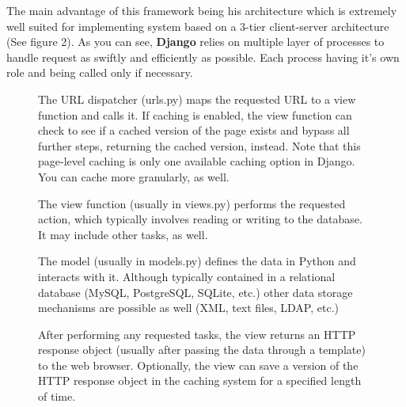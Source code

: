 The main advantage of this framework being his architecture which is
extremely well suited for implementing system based on a 3-tier
client-server architecture (See figure 2). As you can see, \textbf{Django}
relies on multiple layer of processes to handle request as swiftly and
efficiently as possible. Each process having it's own role and being called
only if necessary.  \newline

\begin{enumerate}
\begin{figure}
    \begin{minipage}{\linewidth}
        \centering
        \begin{minipage}{0.45\linewidth}
                \item The URL dispatcher (urls.py) maps the requested URL
                    to a view function and calls it. If caching is enabled,
                    the view function can check to see if a cached version
                    of the page exists and bypass all further steps,
                    returning the cached version, instead. Note that this
                    page-level caching is only one available caching option
                    in Django. You can cache more granularly, as well.
                \item The view function (usually in views.py) performs the
                    requested action, which typically involves reading or
                    writing to the database. It may include other tasks, as
                    well.
                \item The model (usually in models.py) defines the data in
                    Python and interacts with it. Although typically
                    contained in a relational database (MySQL, PostgreSQL,
                    SQLite, etc.) other data storage mechanisms are
                    possible as well (XML, text files, LDAP, etc.)
                \item After performing any requested tasks, the view
                    returns an HTTP response object (usually after passing
                    the data through a template) to the web browser.
                    Optionally, the view can save a version of the HTTP
                    response object in the caching system for a specified
                    length of time.
        \end{minipage}
        \begin{minipage}{0.05\linewidth}
            \vline
        \end{minipage}

\end{minipage}
\end{figure}
\end{enumerate}
